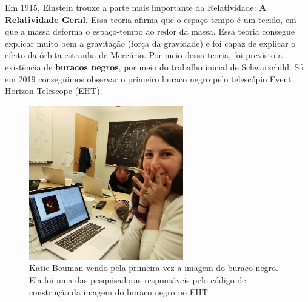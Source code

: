 \documentclass[12pt]{extarticle}
\newcommand{\<}{\langle}
\renewcommand{\>}{\rangle}
\theoremstyle{definition}
\begin{document}
Em 1915, Einstein trouxe a parte mais importante da Relatividade: \textbf{A Relatividade Geral.} Essa teoria afirma que o espaço-tempo é um tecido, em que a massa deforma o espaço-tempo ao redor da massa. Essa teoria consegue explicar muito bem a gravitação (força da gravidade) e foi capaz de explicar o efeito da órbita estranha de Mercúrio. Por meio dessa teoria, foi previsto a existência de \textbf{buracos negros}, por meio do trabalho inicial de Schwarzchild. Só em 2019 conseguimos observar o primeiro buraco negro pelo telescópio Event Horizon Telescope (EHT).
\begin{figure}[H]
    \centering
    \includegraphics[width=0.6\textwidth]{katie.jpg}
    \caption{Katie Bouman vendo pela primeira vez a imagem do buraco negro. Ela foi uma das pesquisadoras responsáveis pelo código de construção da imagem do buraco negro no EHT}
    \label{fig:katie}
\end{figure}
\end{document}
